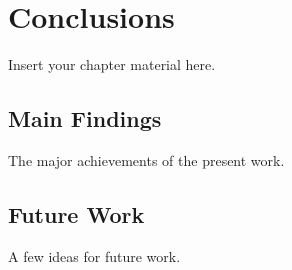 
\chapter{Conclusions}
\label{chapter:conclusions}

Insert your chapter material here.


\section{Main Findings}
\label{section:findings}

The major achievements of the present work.


\section{Future Work}
\label{section:future}

A few ideas for future work.


